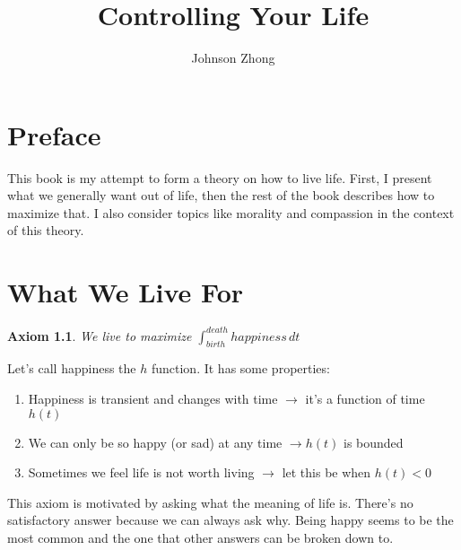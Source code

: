 \documentclass{report}
\newtheorem*{axiom}{Axiom}
\begin{document}
\title{Controlling Your Life}
\author{Johnson Zhong}

\maketitle

\chapter*{Preface}

This book is my attempt to form a theory on how to live life.
First, I present what we generally want out of life, then the rest of the book
describes how to maximize that. I also consider topics like morality
and compassion in the context of this theory.

\chapter{What We Live For}
\begin{axiom}
	We live to maximize $\int_{birth}^{death} happiness \, dt$
\end{axiom}

Let's call happiness the $h$ function. It has some properties:
\begin{enumerate}
	\item Happiness is transient and changes with time $\rightarrow$ it's
	a function of time $h(t)$
	\item We can only be so happy (or sad) at any time $\rightarrow h(t)$ is bounded
	\item Sometimes we feel life is not worth living $\rightarrow$ let this be when $h(t) < 0$
\end{enumerate}  

This axiom is motivated by asking what the meaning of life is.
There's no satisfactory answer because we can always ask why.
Being happy seems to be the most common and the one that
other answers can be broken down to.
\end{document}
